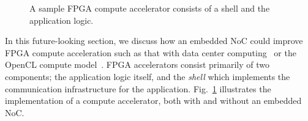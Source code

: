 
\begin{figure}[t]
\centering
{}
\caption{A sample FPGA compute accelerator consists of a shell and the application logic.}
\label{computing}
\end{figure}

In this future-looking section, we discuss how an embedded NoC could improve FPGA compute acceleration such as that with data center computing~\cite{Putnam2014} or the OpenCL compute model~\cite{opencl}.
FPGA accelerators consist primarily of two components; the application logic itself, and the \textit{shell} which implements the communication infrastructure for the application.
Fig.~\ref{computing} illustrates the implementation of a compute accelerator, both with and without an embedded NoC.

